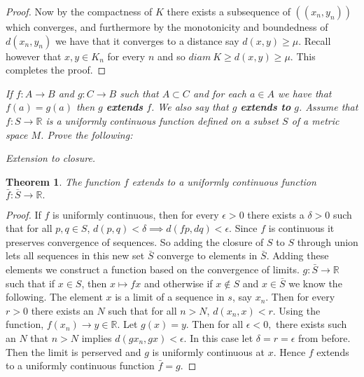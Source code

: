 \documentclass[letter]{article}
\newtheorem{theorem}{Theorem}
\newenvironment{menumerate}{%
  \edef\backupindent{\the\parindent}%
  \enumerate%
  \setlength{\parindent}{\backupindent}%
}{\endenumerate}
\begin{document}
\begin{menumerate}
\begin{proof}
					Now by the compactness of $K$ there exists a subsequence of $((x_n,y_n))$ which converges, and furthermore by the monotonicity and boundedness of $d(x_n,y_n)$ we have that it converges to a distance say $d(x,y) \geq \mu.$ Recall however that $x,y \in K_n$ for every $n$ and so $diam \ K \geq d(x,y) \geq  \mu$. This completes the proof.
			\end{proof}





		\item \emph{If $f: A \to B$ and $g: C \to B$ such that $A \subset C$ and for each $a \in A$ we have that $f(a) = g(a)$ then $g$ \textbf{extends} $f$. We also say that $g$ \textbf{extends to} $g$. Assume that $f: S \to \mathbb{R}$ is a uniformly continuous function defined on a subset $S$ of a metric space $M$. Prove the following:}

			\begin{menumerate}
				\item \emph{Extension to closure.}
					\begin{theorem}
						The function $f$ extends to a uniformly continuous function $\bar f: \bar S \to \mathbb{R}.$
					\end{theorem}
					\begin{proof}
						If $f$ is uniformly continuous, then for every $\epsilon > 0$ there exists a $\delta > 0$ such that for all $p,q \in S$, $d(p,q) < \delta \implies d(fp,dq) < \epsilon.$ Since $f$ is continuous it preserves convergence of sequences. So adding the closure of $S$ to $S$ through union lets all sequences in this new set $\bar S$ converge to elements in $\bar S$. Adding these elements we construct a function based on the convergence of limits. $g : \bar S \to \mathbb{R}$  such that if $x \in S$, then $x \mapsto fx$ and otherwise if $x \notin S$ and $x \in \bar S$ we know the following. The element $x$ is a limit of a sequence in $s$, say $x_n$. Then for every $r > 0$ there exists an $N$ such that for all $n > N$, $d(x_n,x) < r.$ Using the function, $f(x_n) \to y \in \mathbb{R}$. Let $g(x) = y.$ Then for all $\epsilon < 0,$ there exists such an $N$ that $n>N$ implies $d(g x_n, g x) < \epsilon.$ In this case let $\delta = r = \epsilon$ from before. Then the limit is perserved and $g$ is uniformly continuous at $x$. Hence $f$ extends to a uniformly continuous function $\bar f = g$.
					\end{proof}


\end{menumerate}
\end{menumerate}
\end{document}
